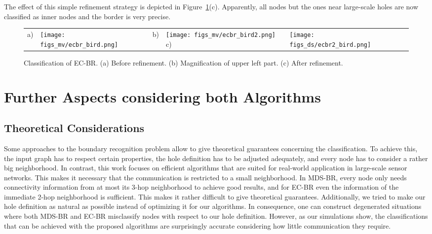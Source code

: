 \documentclass{llncs}
\begin{document}
The effect of this simple refinement strategy is depicted in Figure~\ref{fig::ecbr_example}(c).
Apparently, all nodes but the ones near large-scale holes are now classified as inner nodes and the border is very precise.
\begin{figure}[t]
\centering
\begin{tabular}{llllll}
 a) \hspace{0.1cm} &
\parbox[c]{.2\columnwidth}{\texttt{[image: figs\_mv/ecbr\_bird.png]}} &
\hspace{0.5cm}  b) \hspace{0.1cm} &
\parbox[c]{.2\columnwidth}{\texttt{[image: figs\_mv/ecbr\_bird2.png]}}
\hspace{0.5cm}  c) \hspace{0.1cm} &
\parbox[c]{.2\columnwidth}{\texttt{[image: figs\_ds/ecbr2\_bird.png]}}
\end{tabular}
\caption{Classification of EC-BR. (a) Before refinement. (b) Magnification of upper left part. (c) After refinement.}
\label{fig::ecbr_example}
\end{figure}




\section{Further Aspects considering both Algorithms}

\subsection{Theoretical Considerations}
Some approaches to the boundary recognition problem allow to give theoretical guarantees concerning the classification.
To achieve this, the input graph has to respect certain properties, the hole definition has to be adjusted adequately, and every node has to consider a rather big neighborhood. 
In contrast, this work focuses on efficient algorithms that are suited for real-world application in large-scale sensor networks.
This makes it necessary that the communication is restricted to a small neighborhood.
In MDS-BR, every node only needs connectivity information from at most its 3-hop neighborhood to achieve good results, and for EC-BR even the information of the immediate 2-hop neighborhood is sufficient.
This makes it rather difficult to give theoretical guarantees.
Additionally, we tried to make our hole definition as natural as possible instead of optimizing it for our algorithms.
In consequence, one can construct degenerated situations where both MDS-BR and EC-BR misclassify nodes with respect to our hole definition.
However, as our simulations show, the classifications that can be achieved with the proposed algorithms are surprisingly accurate considering how little communication they require.
\end{document}
